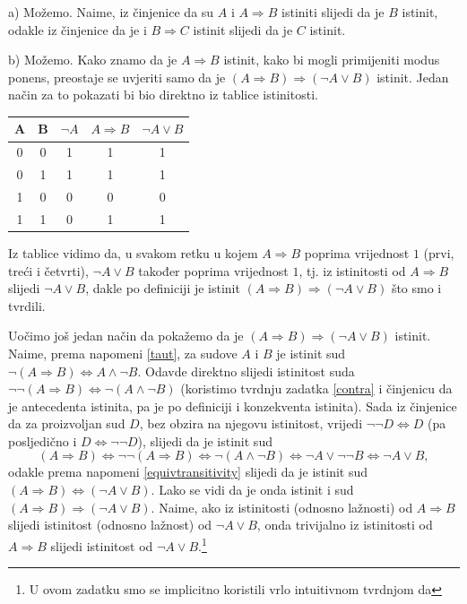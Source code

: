 \documentclass{book}
\renewenvironment{proof}{%
    \vspace{-\parskip}\begin{oldproof}%
    }{%
    \end{oldproof}%
}
\theoremstyle{definition}
\theoremstyle{definition}
\theoremstyle{remark}
\begin{document}
\begin{proof}[Rješenje]
a) Možemo. Naime, iz činjenice da su $A$ i $A\Rightarrow B$ istiniti slijedi da je $B$ istinit, odakle iz činjenice da je i $B\Rightarrow C$ istinit slijedi da je $C$ istinit.

b) Možemo. Kako znamo da je $A\Rightarrow B$ istinit, kako bi mogli primijeniti modus ponens, preostaje se uvjeriti samo da je $(A\Rightarrow B)\Rightarrow (\neg A\vee B)$ istinit. Jedan način za to pokazati bi bio direktno iz tablice istinitosti.
\begin{center}
\begin{tabular}{ |c|c||c|c|c| } 
 \hline
 A & B & $\neg A$ & $A\Rightarrow B$ & $\neg A\vee B$\\
 \hline \hline
 0 & 0 & 1 & 1 & 1 \\ 
 0 & 1 & 1 & 1 & 1 \\ 
 1 & 0 & 0 & 0 & 0 \\
 1 & 1 & 0 & 1 & 1 \\
 \hline
\end{tabular}
\end{center}
Iz tablice vidimo da, u svakom retku u kojem $A\Rightarrow B$ poprima vrijednost $1$ (prvi, treći i četvrti), $\neg A\vee B$ također poprima vrijednost $1$, tj. iz istinitosti od $A\Rightarrow B$ slijedi $\neg A\vee B$, dakle po definiciji je istinit $(A\Rightarrow B)\Rightarrow (\neg A\vee B)$ što smo i tvrdili. 

Uočimo još jedan način da pokažemo da je $(A\Rightarrow B)\Rightarrow (\neg A\vee B)$ istinit. Naime, prema napomeni \ref{taut}, za sudove $A$ i $B$ je istinit sud $\neg(A\Rightarrow B)\Leftrightarrow A\wedge \neg B$. Odavde direktno slijedi istinitost suda $\neg\neg(A\Rightarrow B)\Leftrightarrow \neg(A\wedge \neg B)$ (koristimo tvrdnju zadatka \ref{contra} i činjenicu da je antecedenta istinita, pa je po definiciji i konzekventa istinita).  Sada iz činjenice da za proizvoljan sud $D$, bez obzira na njegovu istinitost, vrijedi $\neg\neg D\Leftrightarrow D$ (pa posljedično i $D\Leftrightarrow \neg\neg D$), slijedi da je istinit sud
$$(A\Rightarrow B)\Leftrightarrow \neg\neg (A\Rightarrow B) \Leftrightarrow \neg(A\wedge \neg B)\Leftrightarrow \neg A \vee \neg\neg B\Leftrightarrow \neg A\vee B,$$
odakle prema napomeni \ref{equivtransitivity} slijedi da je istinit sud $(A\Rightarrow B)\Leftrightarrow (\neg A\vee B)$. Lako se vidi da je onda istinit i sud $(A\Rightarrow B)\Rightarrow (\neg A\vee B)$. Naime, ako iz istinitosti (odnosno lažnosti) od $A\Rightarrow B$ slijedi istinitost (odnosno lažnost) od $\neg A\vee B$, onda trivijalno iz istinitosti od $A\Rightarrow B$ slijedi istinitost od $\neg A\vee B$.\footnote{U ovom zadatku smo se implicitno koristili vrlo intuitivnom tvrdnjom da}
\end{proof}
\end{document}
